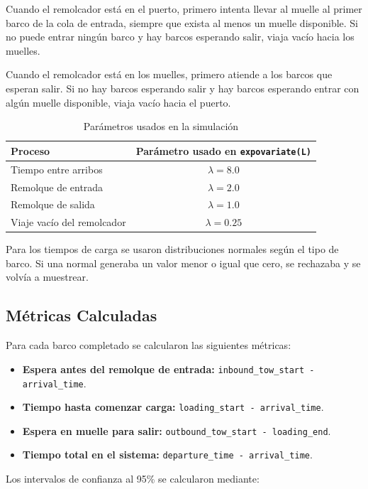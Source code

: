 \documentclass[12pt]{article}
\begin{document}
Cuando el remolcador está en el puerto, primero intenta llevar al muelle al primer barco de la cola de entrada, siempre que exista al menos un muelle disponible. Si no puede entrar ningún barco y hay barcos esperando salir, viaja vacío hacia los muelles.

Cuando el remolcador está en los muelles, primero atiende a los barcos que esperan salir. Si no hay barcos esperando salir y hay barcos esperando entrar con algún muelle disponible, viaja vacío hacia el puerto.


\begin{table}[H]
\centering
\caption{Parámetros usados en la simulación}
\begin{tabular}{lc}
\toprule
\textbf{Proceso} & \textbf{Parámetro usado en \texttt{expovariate(L)}} \\
\midrule
Tiempo entre arribos & $\lambda = 8.0$ \\
Remolque de entrada & $\lambda = 2.0$ \\
Remolque de salida & $\lambda = 1.0$ \\
Viaje vacío del remolcador & $\lambda = 0.25$ \\
\bottomrule
\end{tabular}
\end{table}

Para los tiempos de carga se usaron distribuciones normales según el tipo de barco. Si una normal generaba un valor menor o igual que cero, se rechazaba y se volvía a muestrear.

\subsection{Métricas Calculadas}

Para cada barco completado se calcularon las siguientes métricas:

\begin{itemize}
    \item \textbf{Espera antes del remolque de entrada:} \texttt{inbound\_tow\_start - arrival\_time}.
    \item \textbf{Tiempo hasta comenzar carga:} \texttt{loading\_start - arrival\_time}.
    \item \textbf{Espera en muelle para salir:} \texttt{outbound\_tow\_start - loading\_end}.
    \item \textbf{Tiempo total en el sistema:} \texttt{departure\_time - arrival\_time}.
\end{itemize}

Los intervalos de confianza al 95\% se calcularon mediante:
\end{document}
